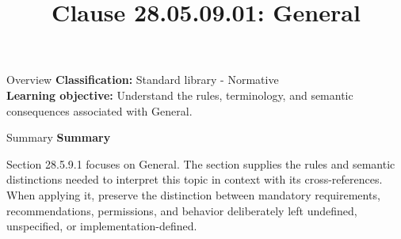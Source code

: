 \documentclass[10pt,letterpaper]{article}
\title{Clause 28.05.09.01: General}
\author{}
\date{}
\begin{document}
\maketitle
\begin{CornellOverviewBox}{Overview}
\textbf{Classification:} Standard library - Normative\\[2pt]
\textbf{Learning objective:} Understand the rules, terminology, and semantic consequences associated with General.
\end{CornellOverviewBox}\begin{CornellSummaryBox}{Summary}
{\sffamily\bfseries\color{Accent} Summary}\par\vspace{3pt}Section 28.5.9.1 focuses on General. The section supplies the rules and semantic distinctions needed to interpret this topic in context with its cross-references. When applying it, preserve the distinction between mandatory requirements, recommendations, permissions, and behavior deliberately left undefined, unspecified, or implementation-defined.
\end{CornellSummaryBox}
\end{document}
